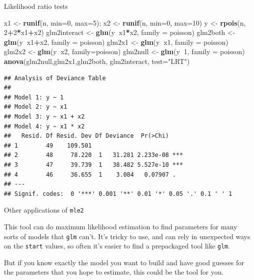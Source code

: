 \documentclass[
  ignorenonframetext,
]{beamer}
\newenvironment{Shaded}{\begin{snugshade}}{\end{snugshade}}
\newcommand{\DataTypeTok}[1]{\textcolor[rgb]{0.13,0.29,0.53}{#1}}
\newcommand{\DecValTok}[1]{\textcolor[rgb]{0.00,0.00,0.81}{#1}}
\newcommand{\KeywordTok}[1]{\textcolor[rgb]{0.13,0.29,0.53}{\textbf{#1}}}
\newcommand{\NormalTok}[1]{#1}
\newcommand{\OperatorTok}[1]{\textcolor[rgb]{0.81,0.36,0.00}{\textbf{#1}}}
\newcommand{\StringTok}[1]{\textcolor[rgb]{0.31,0.60,0.02}{#1}}
\begin{document}
\begin{frame}[fragile]{Likelihood ratio tests}
\protect\hypertarget{likelihood-ratio-tests}{}

\scriptsize

\begin{Shaded}
\begin{Highlighting}[]
\NormalTok{x1 <-}\StringTok{ }\KeywordTok{runif}\NormalTok{(n, }\DataTypeTok{min=}\DecValTok{0}\NormalTok{, }\DataTypeTok{max=}\DecValTok{5}\NormalTok{); x2 <-}\StringTok{ }\KeywordTok{runif}\NormalTok{(n, }\DataTypeTok{min=}\DecValTok{0}\NormalTok{, }\DataTypeTok{max=}\DecValTok{10}\NormalTok{)}
\NormalTok{y <-}\StringTok{ }\KeywordTok{rpois}\NormalTok{(n, }\DecValTok{2}\OperatorTok{+}\DecValTok{2}\OperatorTok{*}\NormalTok{x1}\OperatorTok{+}\NormalTok{x2)}
\NormalTok{glm2interact <-}\StringTok{ }\KeywordTok{glm}\NormalTok{(y}\OperatorTok{~}\NormalTok{x1}\OperatorTok{*}\NormalTok{x2, }\DataTypeTok{family =}\NormalTok{ poisson)}
\NormalTok{glm2both <-}\StringTok{ }\KeywordTok{glm}\NormalTok{(y}\OperatorTok{~}\NormalTok{x1}\OperatorTok{+}\NormalTok{x2, }\DataTypeTok{family =}\NormalTok{ poisson)}
\NormalTok{glm2x1 <-}\StringTok{ }\KeywordTok{glm}\NormalTok{(y}\OperatorTok{~}\NormalTok{x1, }\DataTypeTok{family =}\NormalTok{ poisson)}
\NormalTok{glm2x2 <-}\StringTok{ }\KeywordTok{glm}\NormalTok{(y}\OperatorTok{~}\NormalTok{x2, }\DataTypeTok{family=}\NormalTok{poisson)}
\NormalTok{glm2null <-}\StringTok{ }\KeywordTok{glm}\NormalTok{(y}\OperatorTok{~}\DecValTok{1}\NormalTok{, }\DataTypeTok{family =}\NormalTok{ poisson)}
\KeywordTok{anova}\NormalTok{(glm2null,glm2x1,glm2both, glm2interact, }\DataTypeTok{test=}\StringTok{"LRT"}\NormalTok{)}
\end{Highlighting}
\end{Shaded}

\begin{verbatim}
## Analysis of Deviance Table
## 
## Model 1: y ~ 1
## Model 2: y ~ x1
## Model 3: y ~ x1 + x2
## Model 4: y ~ x1 * x2
##   Resid. Df Resid. Dev Df Deviance  Pr(>Chi)    
## 1        49    109.501                          
## 2        48     78.220  1   31.281 2.233e-08 ***
## 3        47     39.739  1   38.482 5.527e-10 ***
## 4        46     36.655  1    3.084   0.07907 .  
## ---
## Signif. codes:  0 '***' 0.001 '**' 0.01 '*' 0.05 '.' 0.1 ' ' 1
\end{verbatim}

\end{frame}

\begin{frame}[fragile]{Other applications of \texttt{mle2}}
\protect\hypertarget{other-applications-of-mle2}{}

This tool can do maximum likelihood estimation to find parameters for
many sorts of models that \texttt{glm} can't. It's tricky to use, and
can rely in unexpected ways on the \texttt{start} values, so often it's
easier to find a prepackaged tool like \texttt{glm}.

But if you know exactly the model you want to build and have good
guesses for the parameters that you hope to estimate, this could be the
tool for you.

\end{frame}
\end{document}
